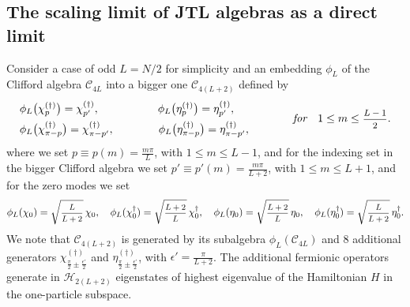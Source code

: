 \documentclass[11pt]{article}
\newcommand{\ffrac}[2]{\mbox{\footnotesize$\displaystyle\frac{#1}{#2}$}}
\newcommand{\Hilb}{\mathcal{H}}
\newcommand{\step}{\epsilon}
\newcommand{\Clif}[1]{\mathscr{C}_{#1}}
\theoremstyle{definition}
\begin{document}
\subsection{The scaling limit of JTL algebras as a direct limit}\label{app:JTL-lim}
Consider a case of odd $L=N/2$ for simplicity and an embedding $\phi_L$ of the Clifford algebra  $\Clif{4L}$ into a bigger one  $\Clif{4(L+2)}$ defined by
\begin{align}\label{eq:phi-def}
\begin{split}
&\phi_L\bigl(\chi^{(\dagger)}_{p}\bigr) = \chi^{(\dagger)}_{p'}, \qquad\qquad\quad\; \phi_L\bigl(\eta^{(\dagger)}_p\bigr) = \eta^{(\dagger)}_{p'},\\
&\phi_L\bigl(\chi^{(\dagger)}_{\pi-p}\bigr) = \chi^{(\dagger)}_{\pi-p'},\qquad\qquad  \phi_L\bigl(\eta^{(\dagger)}_{\pi-p}\bigr) = \eta^{(\dagger)}_{\pi-p'},
\end{split}
\qquad\qquad \textit{for} \quad 1\leq m \leq \ffrac{L-1}{2}.
\end{align}
where we set
$p\equiv p(m)=\frac{m\pi}{L}$, with $1\leq m\leq L-1$, and for the indexing set in the bigger Clifford algebra we set $p'\equiv p'(m)=\frac{m\pi}{L+2}$, with $1\leq m\leq L+1$, and for the zero modes we set
 \begin{equation}\label{eq:phi-def-0}
\phi_L(\chi_0)=\sqrt{\ffrac{L}{L+2}}\,\chi_0, \quad
\phi_L(\chi^{\dagger}_0)=\sqrt{\ffrac{L+2}{L}}\,\chi^{\dagger}_0,\quad
\phi_L(\eta_0)=\sqrt{\ffrac{L+2}{L}}\,\eta_0, \quad
\phi_L(\eta^{\dagger}_0)=\sqrt{\ffrac{L}{L+2}}\,\eta^{\dagger}_0.
 \end{equation}
 We note that  $\Clif{4(L+2)}$ is generated by its subalgebra $\phi_L(\Clif{4L})$ and $8$ additional generators $\chi^{(\dagger)}_{\frac{\pi}{2}\pm\frac{\step'}{2}}$ and $\eta^{(\dagger)}_{\frac{\pi}{2}\pm\frac{\step'}{2}}$, with $\step'=\frac{\pi}{L+2}$. The additional fermionic operators generate in $\Hilb_{2(L+2)}$ eigenstates of highest eigenvalue of the Hamiltonian $H$ in the one-particle subspace.
\end{document}
